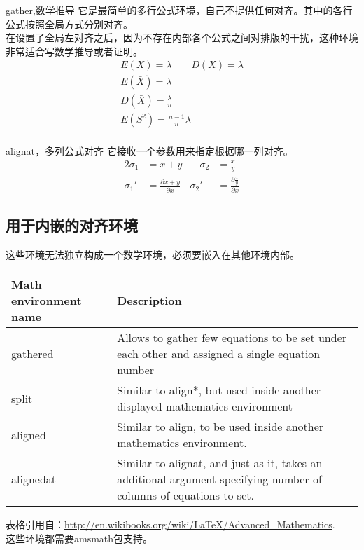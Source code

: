 \begin{frame}{gather,数学推导}
	它是最简单的多行公式环境，自己不提供任何对齐。其中的各行公式按照全局方式分别对齐。\\
	在设置了全局左对齐之后，因为不存在内部各个公式之间对排版的干扰，这种环境非常适合写数学推导或者证明。\\
	\begin{gather*}
	E(X)=\lambda	\qquad	D(X)=\lambda	\\
	E(\bar{X})=\lambda	\\
	D(\bar{X})=\frac{\lambda}{n}	\\
	E(S^2)=\frac{n-1}{n}\lambda	\\
	\end{gather*}
\end{frame}

\begin{frame}{alignat，多列公式对齐}
	它接收一个参数用来指定根据哪一列对齐。
	\begin{alignat}{2}
	 \sigma_1 &= x + y  &\quad \sigma_2 &= \frac{x}{y} \\  
	 \sigma_1' &= \frac{\partial x + y}{\partial x} & \sigma_2'
		&= \frac{\partial \frac{x}{y}}{\partial x}
	\end{alignat}

\end{frame}

\subsection{用于内嵌的对齐环境}
\begin{frame}
	这些环境无法独立构成一个数学环境，必须要嵌入在其他环境内部。
	\begin{tabular}{lp{7cm}}
		\hline Math environment name	&Description\\
		\hline gathered	&Allows to gather few equations to be set under each other and assigned a single equation number\\
		split	&Similar to align*, but used inside another displayed mathematics environment\\
		aligned	&Similar to align, to be used inside another mathematics environment.\\
		alignedat	&Similar to alignat, and just as it, takes an additional argument specifying number of columns of equations to set.\\
		
		\hline
	\end{tabular}

	\vspace{1em}
	表格引用自：\url{http://en.wikibooks.org/wiki/LaTeX/Advanced_Mathematics}.\\
	这些环境都需要amsmath包支持。
\end{frame}

